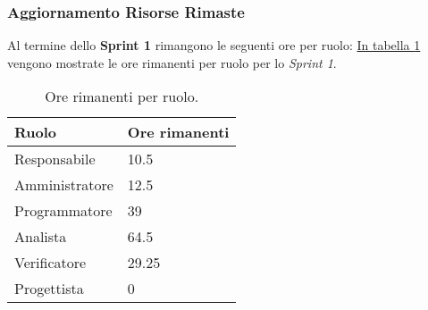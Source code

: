\subsubsection{Aggiornamento Risorse Rimaste}
\label{sec:AggiornamentoRisorse_Sprint1}
Al termine dello \textbf{Sprint 1} rimangono le seguenti ore per ruolo: \hyperref[tab:sprint1_ore_rimanenti]{In tabella \ref{tab:sprint1_ore_rimanenti}} vengono mostrate le ore rimanenti per ruolo per lo \textit{Sprint 1}.

\begin{table}[H]
    \centering
    \begin{tabular}{| l | l |}
    \hline
    \textbf{Ruolo} & 
    \textbf{Ore rimanenti}\\
    \hline
        Responsabile & 10.5\\
    \hline
        Amministratore & 12.5\\
    \hline
        Programmatore & 39\\
    \hline
        Analista & 64.5 \\
    \hline
        Verificatore & 29.25 \\
    \hline
        Progettista & 0 \\
    \hline
    \end{tabular}
    \caption{Ore rimanenti per ruolo.}
    \label{tab:sprint1_ore_rimanenti} 
\end{table}